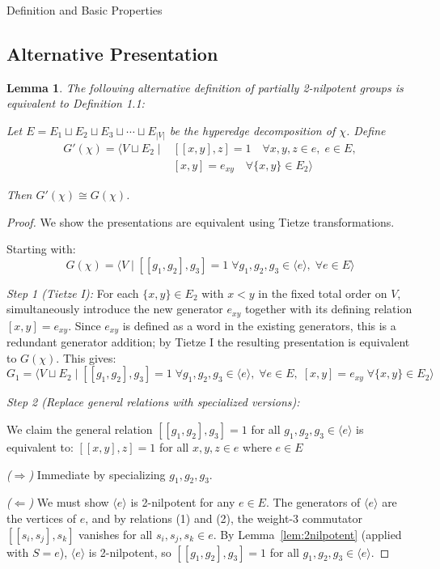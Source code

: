 \documentclass{article}
\newtheorem{lemma}[theorem]{Lemma}
\theoremstyle{definition}
\theoremstyle{remark}
\theoremstyle{theorem}
\theoremstyle{definition}
\begin{document}
\begin{section}{Definition and Basic Properties}
\subsection{Alternative Presentation}

\begin{lemma}\label{lem:alternative}
    The following alternative definition of partially 2-nilpotent groups is equivalent to Definition 1.1:

    Let $E = E_1\sqcup E_2\sqcup E_3\sqcup \cdots \sqcup E_{|V|}$ be the hyperedge decomposition of $\chi$. Define 
    \begin{align*}
    G'(\chi)=\langle V\sqcup E_2 \mid
    &[[x,y],z]=1 \quad \forall x,y,z \in e, \; e \in E,\\
    &[x,y]=e_{xy} \quad \forall \{x,y\} \in E_2 \rangle
    \end{align*}
    
    Then $G'(\chi) \cong G(\chi)$.
\end{lemma}

\begin{proof}
We show the presentations are equivalent using Tietze transformations.

Starting with:
$$G(\chi)=\langle V \mid [[g_1,g_2],g_3]=1\;\forall g_1,g_2,g_3\in \langle e\rangle, \; \forall e\in E \rangle$$

\textit{Step 1 (Tietze I):} For each $\{x,y\} \in E_2$ with $x < y$ in the fixed total order on $V$, simultaneously introduce the new generator $e_{xy}$ together with its defining relation $[x,y] = e_{xy}$. Since $e_{xy}$ is defined as a word in the existing generators, this is a redundant generator addition; by Tietze I the resulting presentation is equivalent to $G(\chi)$. This gives:
$$G_1 = \langle V \sqcup E_2 \mid [[g_1,g_2],g_3]=1\;\forall g_1,g_2,g_3\in \langle e\rangle,\; \forall e\in E,\; [x,y]=e_{xy}\;\forall\{x,y\}\in E_2 \rangle$$

\textit{Step 2 (Replace general relations with specialized versions):} 

We claim the general relation $[[g_1,g_2],g_3]=1$ for all $g_1,g_2,g_3\in \langle e\rangle$ is equivalent to:
$[[x,y],z]=1$ for all $x,y,z \in e$ where $e \in E$

\textit{($\Rightarrow$)} Immediate by specializing $g_1, g_2, g_3$.

\textit{($\Leftarrow$)} We must show $\langle e \rangle$ is 2-nilpotent for any $e \in E$. The generators of $\langle e\rangle$ are the vertices of $e$, and by relations (1) and (2), the weight-3 commutator $[[s_i,s_j],s_k]$ vanishes for all $s_i,s_j,s_k \in e$. By Lemma~\ref{lem:2nilpotent} (applied with $S = e$), $\langle e \rangle$ is 2-nilpotent, so $[[g_1,g_2],g_3]=1$ for all $g_1,g_2,g_3 \in \langle e \rangle$.


\end{proof}
\end{section}
\end{document}
